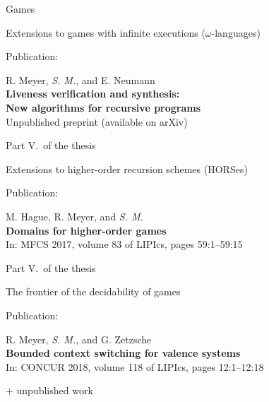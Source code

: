 \documentclass[../talk.tex]{subfiles}
\begin{document}
\begin{frame}{Games}
\begin{overlayarea}{\slidewidth}{\slideheight}
{            Extensions to games with infinite executions ($\omega$-languages)

            \vspace*{2.3em}

            \alert{Publication:}

            \vspace*{1em}

            R. Meyer, \textit{S. M.}, and E. Neumann
            \\
            \textbf{Liveness verification and synthesis:\\ New algorithms for recursive programs}
            \\
            Unpublished preprint (available on arXiv)

        }
        {%
            Part V.~of the thesis

            \vspace*{2.3em}

            Extensions to higher-order recursion schemes (HORSes)

            \vspace*{2.3em}

            \alert{Publication:}

            \vspace*{1em}

            M. Hague, R. Meyer, and \textit{S. M.}
            \\
            \textbf{Domains for higher-order games}
            \\
            In: MFCS 2017, volume 83 of LIPIcs, pages 59:1--59:15
        }
        {%
            Part V.~of the thesis

            \vspace*{2.3em}

            The frontier of the decidability of games

            \vspace*{2.3em}

            \alert{Publication:}

            \vspace*{1em}


            R. Meyer, \textit{S. M.}, and G. Zetzsche
            \\
            \textbf{Bounded context switching for valence systems}
            \\
            In: CONCUR 2018, volume 118 of LIPIcs, pages 12:1--12:18

            \vspace*{1.5em}

            + unpublished work
        }
    \end{overlayarea}
\end{frame}
\end{document}
